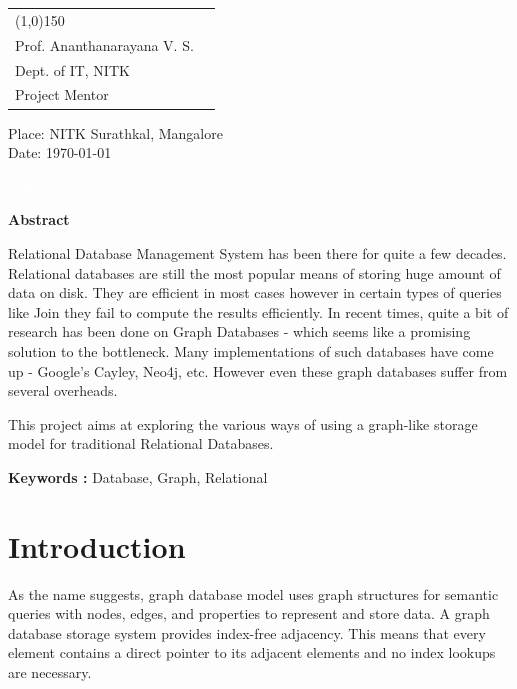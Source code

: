 \documentclass[12pt, oneside]{book}
\begin{document}
\\
\\
\begin{tabular}{l@{\hskip 4cm} r}
	\line(1,0){150} \\
	 Prof. Ananthanarayana V. S. \\
	 Dept. of IT, NITK \\
	 Project Mentor \\ 
\end{tabular}

\vspace{4cm}
\begin{flushleft}
Place: NITK Surathkal, Mangalore \\
Date: \today
\end{flushleft}

\pagebreak \textcolor{white}{text} \pagebreak
\thispagestyle{empty}
\begin{center}
	\textbf{ \huge Abstract}
\end{center}
\vspace{1cm}
Relational Database Management System has been there for quite a few decades. Relational databases are still the most popular means of storing huge amount of data on disk. They are efficient in most cases however in certain types of queries like Join they fail to compute the results efficiently. In recent times, quite a bit of research has been done on Graph Databases - which seems like a promising solution to the bottleneck. Many implementations of such databases have come up - Google's Cayley, Neo4j, etc. However even these graph databases suffer from several overheads.
\par
This project aims at exploring the various ways of using a graph-like storage model for traditional Relational Databases. \\
\par
\textbf{Keywords : }Database, Graph, Relational

\thispagestyle{empty}
\listoffigures
\tableofcontents

\setcounter{page}{1}

\chapter{Introduction}
As the name suggests, graph database model uses graph structures for semantic queries with nodes, edges, and properties to represent and store data. A graph database storage system provides index-free adjacency. This means that every element contains a direct pointer to its adjacent elements and no index lookups are necessary.
\end{document}
